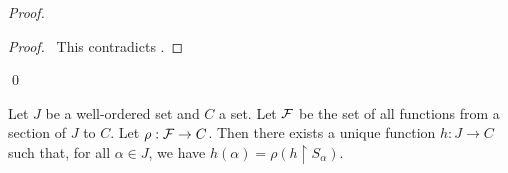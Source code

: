 \begin{proof}
    \pf
    \qedstep
    \begin{proof}
        \pf\ This contradicts .
    \end{proof}
    \qed
\end{proof}

\begin{theorem}
    Let $J$ be a well-ordered set and $C$ a set. Let $\mathcal{F}$ be the set of all functions from a section of $J$ to $C$.
    Let $\rho : \mathcal{F} \rightarrow C$. Then there exists a unique function $h : J \rightarrow C$ such that, for all $\alpha \in J$,
    we have $h(\alpha) = \rho(h \restriction S_\alpha)$.
\end{theorem}

